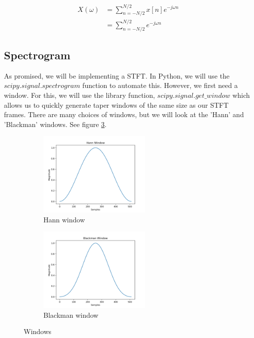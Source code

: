 \documentclass[11pt,a4paper]{article}
\begin{document}
\begin{align*}
X(\omega) &= \sum_{n=-N/2}^{N/2} x[n]e^{-j\omega n} \\
		  &= \sum_{n=-N/2}^{N/2} e^{-j\omega n} 
\end{align*}

\clearpage

\subsection{Spectrogram} As promised, we will be implementing a STFT. In Python, we will use the $scipy.signal.spectrogram$ function to automate this. However, we first need a window. For this, we will use the library function, $scipy.signal.get\_window$ which allows us to quickly generate taper windows of the same size as our STFT frames. There are many choices of windows, but we will look at the 'Hann' and 'Blackman' windows. See figure \ref{fig:windows}.

\begin{figure}[ht]
	\centering
	\begin{subfigure}[t]{\hsize}
	\centering
		\includegraphics[width=0.6\textwidth]{hann}
		\caption{Hann window}
		\label{fig:hann}
	\end{subfigure}
	\begin{subfigure}[t]{\hsize}
		\centering
		\includegraphics[width=0.6\textwidth]{blackman}
		\caption{Blackman window}
		\label{fig:blackman}
	\end{subfigure}
	\caption{Windows}
	\label{fig:windows}
\end{figure}
\end{document}
